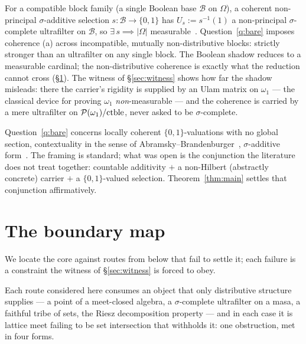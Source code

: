 \begin{remark}\label{rem:not-measurable}
For a compatible block family (a single Boolean base $\mathcal B$ on $\Omega$), a
coherent non-principal $\sigma$-additive selection $s\colon\mathcal B\to\{0,1\}$
has $U_s := s^{-1}(1)$ a non-principal $\sigma$-complete ultrafilter on
$\mathcal B$, so $\exists\, s \implies |\Omega|$ measurable~\cite{Jech2003}.
Question~\ref{q:bare} imposes coherence (a) across incompatible, mutually
non-distributive blocks: strictly stronger than an ultrafilter on any single
block. The Boolean shadow reduces to a measurable cardinal; the non-distributive
coherence is exactly what the reduction cannot cross (\S\ref{sec:boundary}).
The witness of \S\ref{sec:witness} shows how far the shadow misleads: there the
carrier's rigidity is supplied by an Ulam matrix on $\omega_1$ --- the classical
device for proving $\omega_1$ \emph{non}-measurable --- and the coherence is
carried by a mere ultrafilter on $\mathcal{P}(\omega_1)/\mathrm{ctble}$, never asked to be
$\sigma$-complete.
\end{remark}

\begin{remark}\label{rem:sheaf}
Question~\ref{q:bare} concerns locally coherent $\{0,1\}$-valuations with no
global section, contextuality in the sense of
Abramsky--Brandenburger~\cite{AbramskyBrandenburger2011}, $\sigma$-additive
form~\cite{AbramskyBarbosaEtAl2022}. The framing is standard; what was open is the
conjunction the literature does not treat together: countable additivity $+$ a
non-Hilbert (abstractly concrete) carrier $+$ a $\{0,1\}$-valued selection.
Theorem~\ref{thm:main} settles that conjunction affirmatively.
\end{remark}


\section{The boundary map}\label{sec:boundary}

We locate the core against routes from below that fail to settle it; each
failure is a constraint the witness of \S\ref{sec:witness} is forced to obey.

Each route considered here consumes an object that only distributive structure
supplies --- a point of a meet-closed algebra, a $\sigma$-complete ultrafilter
on a masa, a faithful tribe of sets, the Riesz decomposition property --- and in
each case it is lattice meet failing to be set intersection that withholds it:
one obstruction, met in four forms.

